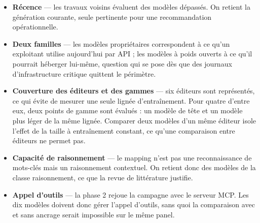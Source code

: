 \begin{itemize}
\item
  \textbf{Récence} --- les travaux voisins évaluent des modèles dépassés. On retient la génération courante, seule pertinente pour une recommandation opérationnelle.
\item
  \textbf{Deux familles} --- les modèles propriétaires correspondent à ce qu'un exploitant utilise aujourd'hui par API ; les modèles à poids ouverts à ce qu'il pourrait héberger lui-même, question qui se pose dès que des journaux d'infrastructure critique quittent le périmètre.
\item
  \textbf{Couverture des éditeurs et des gammes} --- six éditeurs sont représentés, ce qui évite de mesurer une seule lignée d'entraînement. Pour quatre d'entre eux, deux points de gamme sont évalués : un modèle de tête et un modèle plus léger de la même lignée. Comparer deux modèles d'un même éditeur isole l'effet de la taille à entraînement constant, ce qu'une comparaison entre éditeurs ne permet pas.
\item
  \textbf{Capacité de raisonnement} --- le mapping n'est pas une reconnaissance de mots-clés mais un raisonnement contextuel. On retient donc des modèles de la classe raisonnement, ce que la revue de littérature justifie.
\item
  \textbf{Appel d'outils} --- la phase 2 rejoue la campagne avec le serveur MCP. Les dix modèles doivent donc gérer l'appel d'outils, sans quoi la comparaison avec et sans ancrage serait impossible sur le même panel.
\end{itemize}


